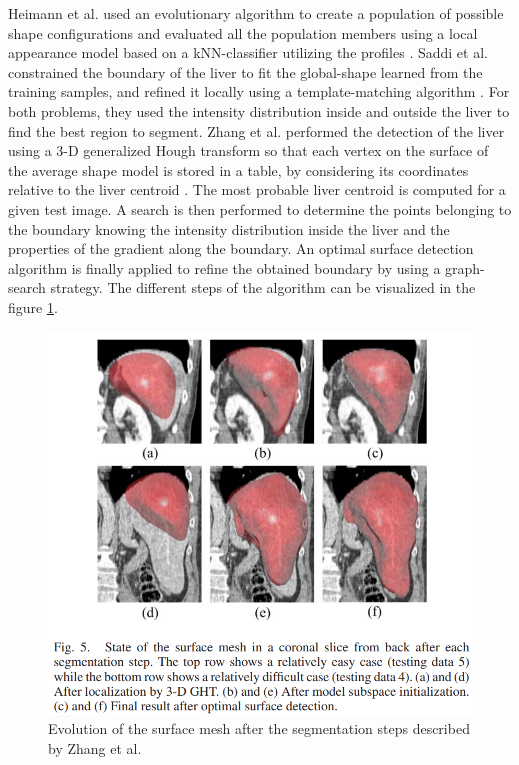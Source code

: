 \documentclass[]{article}
\begin{document}
Heimann et al. used an evolutionary algorithm to create a population of
possible shape configurations and evaluated all the population members
using a local appearance model based on a kNN-classifier utilizing the
profiles  \cite{Heimann2007}. 
Saddi et al. constrained the boundary of the liver to fit the
global-shape learned from the training samples, and refined it locally
using a template-matching algorithm \cite{Saddi2007}. For both problems, they used the
intensity distribution inside and outside the liver to find the best
region to segment. Zhang et al. performed the detection of the liver using a 3-D
generalized Hough transform so that each vertex on the surface of the
average shape model is stored in a table, by considering its coordinates
relative to the liver centroid \cite{Zhang2010}. The most probable liver centroid is
computed for a given test image. A search is then performed to determine
the points belonging to the boundary knowing the intensity distribution
inside the liver and the properties of the gradient along the boundary.
An optimal surface detection algorithm is finally applied to refine the
obtained boundary by using a graph-search strategy. The different steps
of the algorithm can be visualized in the figure \ref{Zhang2010_Fig5}.

\begin{figure}[th!]
	\centering
	\includegraphics[width=0.7\linewidth]{images/image29}
	\caption{Evolution of the surface mesh after the segmentation steps described by Zhang et al. \cite{Zhang2010}}
	\label{Zhang2010_Fig5}
\end{figure}
\end{document}
